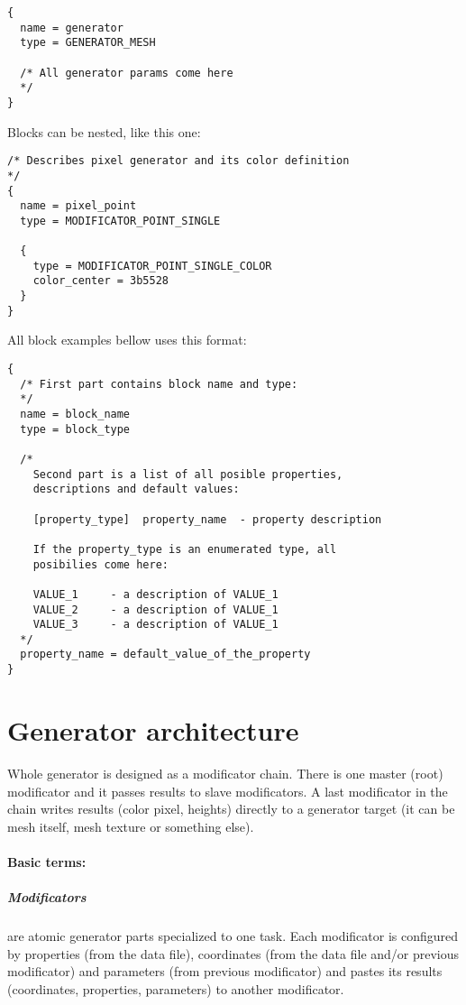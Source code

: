 \documentclass[11pt]{article}
\begin{document}
\begin{verbatim}
{
  name = generator
  type = GENERATOR_MESH

  /* All generator params come here
  */
}
\end{verbatim}

Blocks can be nested, like this one:

\begin{verbatim}
/* Describes pixel generator and its color definition
*/
{
  name = pixel_point
  type = MODIFICATOR_POINT_SINGLE

  {
    type = MODIFICATOR_POINT_SINGLE_COLOR
    color_center = 3b5528
  }
}
\end{verbatim}

All block examples bellow uses this format:

\begin{verbatim}
{
  /* First part contains block name and type:
  */
  name = block_name
  type = block_type

  /*
    Second part is a list of all posible properties,
    descriptions and default values:

    [property_type]  property_name  - property description
   
    If the property_type is an enumerated type, all 
    posibilies come here:
    
    VALUE_1     - a description of VALUE_1
    VALUE_2     - a description of VALUE_1
    VALUE_3     - a description of VALUE_1
  */  
  property_name = default_value_of_the_property  
}
\end{verbatim}

\section{Generator architecture}

Whole generator is designed as a modificator chain. There is one master (root)
modificator and it passes results to slave modificators. A last modificator 
in the chain writes results (color pixel, heights) directly to a generator target
(it can be mesh itself, mesh texture or something else).

\paragraph{Basic terms:}
\subparagraph{Modificators}
are atomic generator parts specialized to one task. Each modificator 
is configured by properties (from the data file), coordinates (from the data 
file and/or previous modificator) and parameters (from previous modificator) and
pastes its results (coordinates, properties, parameters) to another modificator. 
\end{document}
